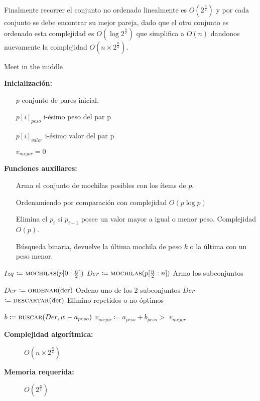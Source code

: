 \documentclass[fleqn, 11pt]{article}
\def\is{\coloneqq}
\begin{document}
Finalmente recorrer el conjunto no ordenado linealmente es $O(2^\frac{n}{2})$ y por cada conjunto se debe encontrar su mejor pareja, dado que el otro conjunto es ordenado esta complejidad es $O(\log{2^\frac{n}{2}})$ que simplifica a $O(n)$ dandonos nuevamente la complejidad $O(n \times 2^{\frac{n}{2}})$.

\begin{algorithm}
\caption{Meet in the middle}
\begin{algorithmic}[1]
\item[\textbf{Inicialización:}]
\item[] \begin{itemize}
	\item[] $p$ conjunto de pares inicial.
	\item[] $p[i]_{peso}$ i-ésimo peso del par p
	\item[] $p[i]_{valor}$ i-ésimo valor del par p
	\item[] $v_{mejor} = 0$
\end{itemize}
\item[\textbf{Funciones auxiliares:}]
\item[] \begin{itemize}
	\setlength\itemsep{0.3em}
	\item[]  Arma el conjunto de mochilas posibles con
	los ítems de $p$.
	
	\item[]  Ordenamiendo por comparación con
	complejidad $O(p\log p)$
	
	\item[]  Elimina el $p_i$ si $p_{i-1}$ posee un
	valor mayor a igual o menor peso. Complejidad $O(p)$.

	\item[]  Búsqueda binaria, devuelve la última
	mochila de peso $k$ o la última con un peso menor.
\end{itemize}
\Statex
{}
\State $Izq$ $\is \Call{mochilas}{p[0:\frac{n}{2}]}$
\State $Der$ $\is \Call{mochilas}{p[\frac{n}{2}:n]}$
\Comment Armo los subconjuntos

\State $Der$ $\is \Call{ordenar}{\text{der}}$
\Comment Ordeno uno de los 2 subconjuntos
\State $Der$ $\is \Call{descartar}{\text{der}}$
\Comment Elimino repetidos o no óptimos

	\State $b \is \Call{buscar}{Der, w - a_{peso}}$
			\State  $v_{mejor} \is a_{peso} + b_{peso} > $
		\EndIf
	\EndIf
\EndFor
\State \Return $v_{mejor}$
\EndFunction
\end{algorithmic}
\begin{description}
	\item[\textbf{Complejidad algorítmica:}] $O(n \times 2^{\frac{n}{2}})$
	\item[\textbf{Memoria requerida:}] $O(2^{\frac{n}{2}})$
\end{description}
\end{algorithm}
\end{document}
